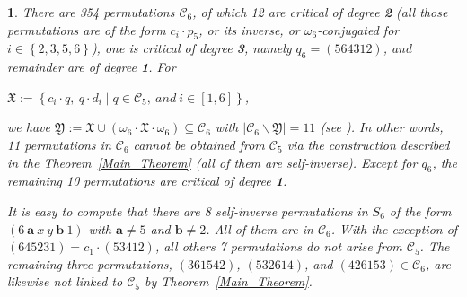 \documentclass[a4 paper,12pt]{article}
\newcommand{\ger}[1]{\mathfrak{#1}}
\newtheorem{numeris}{}[section]
\begin{document}

\begin{numeris} 
 There are   354  permutations $\mathcal{C}_{6}$, of which  12 are  critical   of degree \textbf{\textit{2}} (all those permutations are of the form $c_{i}\cdot p_5$,  or its inverse, or $\omega_6$-conjugated  for $i\in \left\{2,3,5,6\right\}$), \textit{one} is critical of degree \textbf{\textit{3}}, namely  $q_6=(564312)$, and remainder are of degree \textbf{\textit{1}}. For  
 \begin{center}
 $\ger{X} :=\left\{c_i\cdot q , \ q\cdot d_i \mid q\in \mathcal{C}_{5}, \ and \ i\in \left[1,6\right]\right\}$,
 \end{center}
	we have $\ger{Y}:= \ger{X}  \cup \left(\omega_6\cdot \ger{X} \cdot\omega_6\right) \subseteq \mathcal{C}_{6}$ with $\left|\mathcal{C}_{6}\backslash \ger{Y}\right|=11$ (see \cite{Elbos}). In other words, 11 permutations in $\mathcal{C}_6$ cannot be obtained from $\mathcal{C}_5$ via the construction described in the Theorem~\ref{Main_Theorem} (all of them are self-inverse). Except for $q_6$, the remaining 10 permutations are critical of degree \textbf{\textit{1}}. 
	
	It is easy to compute that there are 8 self-inverse permutations in  $S_{6}$ of the form 
 $ \left(6 \  \textbf{a} \ x \ y \  \textbf{b} \ 1\right)$ with $\textbf{a}\neq 5$ and  $\textbf{b}\neq 2$. All of them are in $\mathcal{C}_6$. 
 With the exception of $(645231)= c_1 \cdot  (53412)$, all others 7 permutations  do not arise from  $\mathcal{C}_5$. The remaining three permutations, $(361542)$, $(532614)$, and $(426153) \in \mathcal{C}_{6}$, are likewise not linked to $\mathcal{C}_5$ by Theorem~\ref{Main_Theorem}.
\label{Critical_in_S_6}
\end{numeris} 
\end{document}

